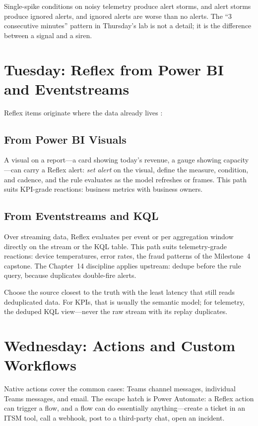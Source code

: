\begin{pitfall}
Single-spike conditions on noisy telemetry produce alert storms, and alert storms produce ignored alerts, and ignored alerts are worse than no alerts. The ``3 consecutive minutes'' pattern in Thursday's lab is not a detail; it is the difference between a signal and a siren.
\end{pitfall}

\section{Tuesday: Reflex from Power BI and Eventstreams}
Reflex items originate where the data already lives \cite{microsoftDataActivator}:

\subsection{From Power BI Visuals}
A visual on a report---a card showing today's revenue, a gauge showing capacity---can carry a Reflex alert: \emph{set alert} on the visual, define the measure, condition, and cadence, and the rule evaluates as the model refreshes or frames. This path suits KPI-grade reactions: business metrics with business owners.

\subsection{From Eventstreams and KQL}
Over streaming data, Reflex evaluates per event or per aggregation window directly on the stream or the KQL table. This path suits telemetry-grade reactions: device temperatures, error rates, the fraud patterns of the Milestone~4 capstone. The Chapter~14 discipline applies upstream: dedupe before the rule query, because duplicates double-fire alerts.

\begin{tipbox}
Choose the source closest to the truth with the least latency that still reads deduplicated data. For KPIs, that is usually the semantic model; for telemetry, the deduped KQL view---never the raw stream with its replay duplicates.
\end{tipbox}

\section{Wednesday: Actions and Custom Workflows}
Native actions cover the common cases: Teams channel messages, individual Teams messages, and email. The escape hatch is Power Automate: a Reflex action can trigger a flow, and a flow can do essentially anything---create a ticket in an ITSM tool, call a webhook, post to a third-party chat, open an incident.

